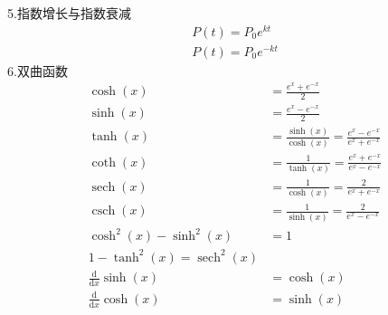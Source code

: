 \documentclass[UTF8,fontset=ubuntu]{ctexart}
\DeclareMathOperator{\sech}{sech}
\DeclareMathOperator{\csch}{csch}
\begin{document}
	5.指数增长与指数衰减
	\begin{align}
			P(t)=P_0e^{kt}\\
			P(t)=P_0e^{-kt}
	\end{align}
	6.双曲函数
	\begin{align}
			\cosh (x)&=\frac{e^x+e^{-x}}{2}\\
			\sinh (x)&=\frac{e^x-e^{-x}}{2}\\
			\tanh (x)&=\frac{\sinh (x)}{\cosh (x)}=\frac{e^x-e^{-x}}{e^x+e^{-x}}\\
			\coth (x)&=\frac{1}{\tanh (x)}=\frac{e^x+e^{-x}}{e^x-e^{-x}}\\
			\sech (x)&=\frac{1}{\cosh (x)}=\frac{2}{e^x+e^{-x}}\\
			\csch (x)&=\frac{1}{\sinh (x)}=\frac{2}{e^x-e^{-x}}\\
			\cosh^2(x)-\sinh^2(x)&=1\\
			1-\tanh^2(x)=\sech^2(x)\\
			\frac{\mathrm{d}}{\mathrm{d}x}\sinh (x)&=\cosh (x)\\
			\frac{\mathrm{d}}{\mathrm{d}x}\cosh (x)&=\sinh (x)
	\end{align}
\end{document}
